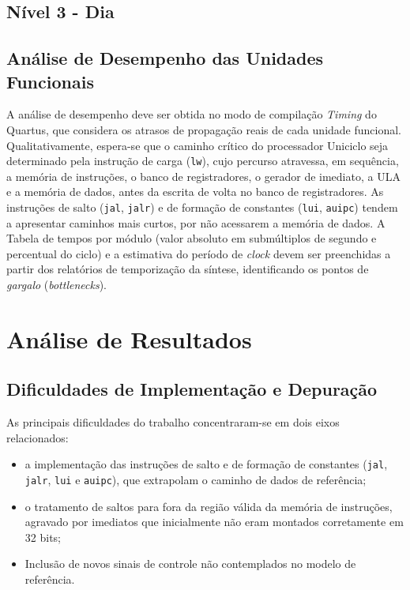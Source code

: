 \documentclass[conference]{IEEEtran}
\begin{document}
\subsection{Nível 3 - Dia }



\subsection{Análise de Desempenho das Unidades Funcionais}
%
%
A análise de desempenho deve ser obtida no modo de compilação \textit{Timing} do Quartus, que considera os
atrasos de propagação reais de cada unidade funcional. Qualitativamente, espera-se que o caminho crítico do
processador Uniciclo seja determinado pela instrução de carga (\texttt{lw}), cujo percurso atravessa, em
sequência, a memória de instruções, o banco de registradores, o gerador de imediato, a ULA e a memória de
dados, antes da escrita de volta no banco de registradores. As instruções de salto (\texttt{jal},
\texttt{jalr}) e de formação de constantes (\texttt{lui}, \texttt{auipc}) tendem a apresentar caminhos mais
curtos, por não acessarem a memória de dados. A Tabela de tempos por módulo (valor absoluto em
submúltiplos de segundo e percentual do ciclo) e a estimativa do período de \textit{clock} devem ser
preenchidas a partir dos relatórios de temporização da síntese, identificando os pontos de
\textit{gargalo} (\textit{bottlenecks}).

\section{Análise de Resultados}


\subsection{Dificuldades de Implementação e Depuração}
\label{sec:dificuldades}
As principais dificuldades do trabalho concentraram-se em dois eixos relacionados: 
\begin{itemize}
    \item a implementação das
instruções de salto e de formação de constantes (\texttt{jal}, \texttt{jalr}, \texttt{lui} e
\texttt{auipc}), que extrapolam o caminho de dados de referência;
    \item  o tratamento de saltos para fora
da região válida da memória de instruções, agravado por imediatos que inicialmente não eram montados
corretamente em 32 bits;
    \item Inclusão de novos sinais de controle não contemplados no modelo de referência.
\end{itemize}
\end{document}
